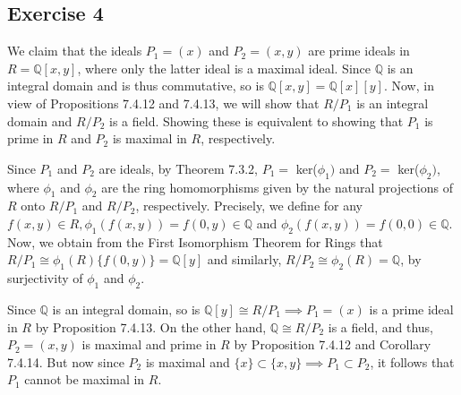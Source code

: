 \subsection*{Exercise 4}
We claim that the ideals $P_1 = (x)$ and $P_2 = (x,y)$ are prime ideals in $R = \mathbb{Q}[x,y]$, where only the latter ideal is a maximal ideal. Since $\mathbb{Q}$ is an integral domain and is thus commutative, so is $\mathbb{Q}[x,y] = \mathbb{Q}[x][y]$. Now, in view of Propositions 7.4.12 and 7.4.13, we will show that $R/P_1$ is an integral domain and $R/P_2$ is a field. Showing these is equivalent to showing that $P_1$ is prime in $R$ and $P_2$ is maximal in $R$, respectively.

Since $P_1$ and $P_2$ are ideals, by Theorem 7.3.2, $P_1 =$ ker($\phi_1)$ and $P_2 =$ ker($\phi_2)$, where $\phi_1$ and $\phi_2$ are the ring homomorphisms given by the natural projections of $R$ onto $R/P_1$ and $R/P_2$, respectively. Precisely, we define for any $f(x,y) \in R, \phi_1(f(x,y)) = f(0,y) \in \mathbb{Q}$ and $\phi_2(f(x,y)) = f(0,0) \in \mathbb{Q}$. Now, we obtain from the First Isomorphism Theorem for Rings that $R/P_1 \cong \phi_1(R) \{f(0,y)\} = \mathbb{Q}[y]$ and similarly, $R/P_2 \cong \phi_2(R) = \mathbb{Q}$, by surjectivity of $\phi_1$ and $\phi_2$. 

Since $\mathbb{Q}$ is an integral domain, so is $\mathbb{Q}[y] \cong R/P_1 \implies P_1 = (x)$ is a prime ideal in $R$ by Proposition 7.4.13. On the other hand, $\mathbb{Q} \cong R/P_2$ is a field, and thus, $P_2 = (x,y)$ is maximal and prime in $R$ by Proposition 7.4.12 and Corollary 7.4.14. But now since $P_2$ is maximal and $\{x\} \subset \{x,y\} \implies P_1 \subset P_2$, it follows that $P_1$ cannot be maximal in $R$.